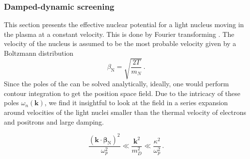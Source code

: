 \subsubsection{Damped-dynamic screening}\label{sec:DDS}
This section presents the effective nuclear potential for a light nucleus moving in the plasma at a constant velocity. This is done by Fourier transforming . The velocity of the nucleus is assumed to be the most probable velocity given by a Boltzmann distribution
\begin{equation}\label{eq:vel}
 \beta_{\text{N}} = \sqrt{\frac{2T}{m_N}}\,. 
\end{equation}
Since the poles of the  can be solved analytically, ideally, one would perform contour integration to get the position space field. Due to the intricacy of these poles $\omega_n(\boldsymbol{k})$, we find it insightful to look at the field in a series expansion around velocities of the light nuclei smaller than the thermal velocity of electrons and positrons and large damping.

\begin{equation}\label{eq:expansion}
\frac{(\boldsymbol{k}\cdot\boldsymbol{\beta}_{\text{N}})^2}{\omega_p^2} \ll \frac{\boldsymbol{k}^2}{m_D^2} \ll \frac{\kappa^2}{\omega_p^2}\, .
\end{equation}


